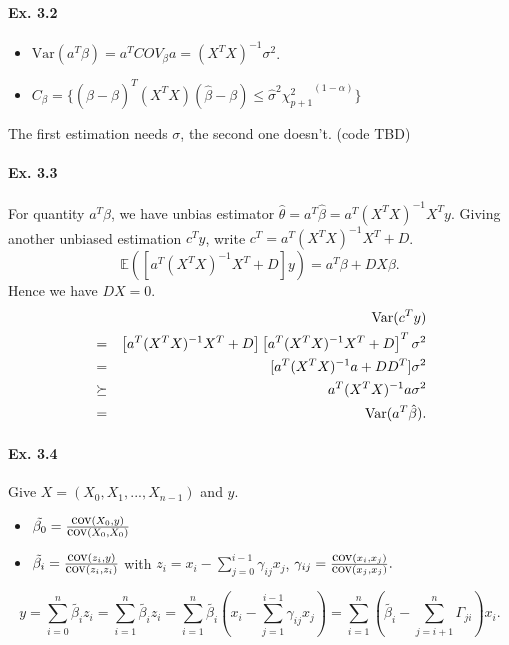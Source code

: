 \paragraph*{Ex. 3.2}

\begin{itemize}
    \item $\mbox{Var}(a^{T}\beta) = a^{T}COV_\beta a = (X^{T}X)^{-1}\sigma^2$.
    \item $C_{\beta}=\{(\hat{\beta} - \beta)^T(X^TX)(\hat{\beta} - \beta)\leq \hat{\sigma}^2 {\chi_{p+1}^2}^{(1-\alpha)}\}$
\end{itemize}

The first estimation needs $\sigma$, the second one doesn't. (code TBD)

\paragraph*{Ex. 3.3}
For quantity $a^{T}\beta$, we have unbias estimator $\hat{\theta} = a^T\hat{\beta} = a^T (X^{T}X)^{-1}X^{T}y.$ Giving another unbiased estimation $c^{T}y$, write $c^{T} = a^{T}(X^{T}X)^{-1}X^{T} + D$.
$$\mathbb{E}(\left[a^{T}(X^{T}X)^{-1}X^{T} + D\right]y)=a^{T}\beta + DX\beta.$$
Hence we have $DX = 0$.
\begin{eqnarray*}
    & & \operatorname*{\mbox{Var}}(c^{T}y) \\
    &=& \left[a^{T}(X^{T}X)^{-1}X^{T} + D\right]\left[a^{T}(X^{T}X)^{-1}X^{T} + D\right]^T \sigma^2\\
    &=& [a^{T}(X^{T}X)^{-1}a + DD^T]\sigma^2 \\
    &\succeq& a^{T}(X^{T}X)^{-1}a\sigma^2 \\
    &=& \operatorname*{\mbox{Var}}(a^T\hat{\beta}).
\end{eqnarray*}

\paragraph*{Ex. 3.4}
Give $X = (X_0, X_1, ..., X_{n - 1})$ and $y$.
\begin{itemize}
    \item $\tilde{\beta_0} = \frac{\operatorname*{\mbox{cov}}(X_0, y)}{\operatorname*{\mbox{cov}}(X_0, X_0)}$
    \item $\tilde{\beta_i} = \frac{\operatorname*{\mbox{cov}}(z_i, y)}{\operatorname*{\mbox{cov}}(z_i, z_i)}$ with $z_i = x_i - \sum_{j=0}^{i-1} \gamma_{ij} x_j$, $\gamma_{ij} = \frac{\operatorname*{\mbox{cov}}(x_i, x_j)}{\operatorname*{\mbox{cov}}(x_j, x_j)}.$
\end{itemize}
$$y = \sum_{i=0}^{n}\tilde{\beta_i}z_{i} = \sum_{i=1}^{n}\tilde{\beta_i}z_{i}= \sum_{i=1}^{n}\tilde{\beta_i}(x_i - \sum_{j=1}^{i-1} \gamma_{ij} x_j)= \sum_{i=1}^{n}(\tilde{\beta_i}-\sum_{j=i+1}^{n}\Gamma_{ji})x_i.$$


